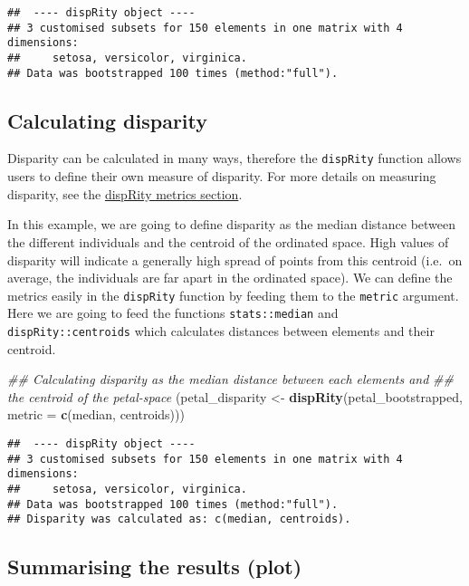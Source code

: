 \documentclass[
]{book}
\newenvironment{Shaded}{\begin{snugshade}}{\end{snugshade}}
\newcommand{\CommentTok}[1]{\textcolor[rgb]{0.56,0.35,0.01}{\textit{#1}}}
\newcommand{\DataTypeTok}[1]{\textcolor[rgb]{0.13,0.29,0.53}{#1}}
\newcommand{\KeywordTok}[1]{\textcolor[rgb]{0.13,0.29,0.53}{\textbf{#1}}}
\newcommand{\NormalTok}[1]{#1}
\newcommand{\StringTok}[1]{\textcolor[rgb]{0.31,0.60,0.02}{#1}}
\begin{document}
\begin{verbatim}
##  ---- dispRity object ---- 
## 3 customised subsets for 150 elements in one matrix with 4 dimensions:
##     setosa, versicolor, virginica.
## Data was bootstrapped 100 times (method:"full").
\end{verbatim}

\hypertarget{calculating-disparity}{%
\subsection{Calculating disparity}\label{calculating-disparity}}

Disparity can be calculated in many ways, therefore the \texttt{dispRity} function allows users to define their own measure of disparity.
For more details on measuring disparity, see the \protect\hyperlink{disparity-metrics}{dispRity metrics section}.

In this example, we are going to define disparity as the median distance between the different individuals and the centroid of the ordinated space.
High values of disparity will indicate a generally high spread of points from this centroid (i.e.~on average, the individuals are far apart in the ordinated space).
We can define the metrics easily in the \texttt{dispRity} function by feeding them to the \texttt{metric} argument.
Here we are going to feed the functions \texttt{stats::median} and \texttt{dispRity::centroids} which calculates distances between elements and their centroid.

\begin{Shaded}
\begin{Highlighting}[]
\CommentTok{\#\# Calculating disparity as the median distance between each elements and}
\CommentTok{\#\# the centroid of the petal{-}space}
\NormalTok{(petal\_disparity \textless{}{-}}\StringTok{ }\KeywordTok{dispRity}\NormalTok{(petal\_bootstrapped, }\DataTypeTok{metric =} \KeywordTok{c}\NormalTok{(median, centroids)))}
\end{Highlighting}
\end{Shaded}

\begin{verbatim}
##  ---- dispRity object ---- 
## 3 customised subsets for 150 elements in one matrix with 4 dimensions:
##     setosa, versicolor, virginica.
## Data was bootstrapped 100 times (method:"full").
## Disparity was calculated as: c(median, centroids).
\end{verbatim}

\hypertarget{summarising-the-results-plot}{%
\subsection{Summarising the results (plot)}\label{summarising-the-results-plot}}
\end{document}
